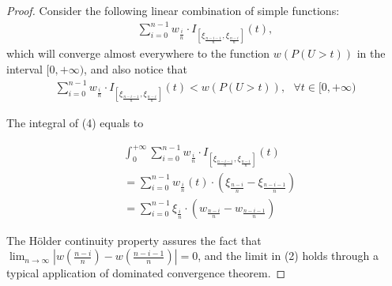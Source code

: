 \begin{proof}
Consider the following linear combination of simple functions:
\begin{align}
\sum_{i=0}^{n-1} w_{\frac{i}{n}} 
\cdot I_{[\xi_\frac{n-i-1}{n}, \xi_\frac{n-i}{n}]}(t),
\end{align}
which will converge almost everywhere to the function $w(P(U>t))$ in the interval $[0, +\infty)$, and also notice that 
\begin{align}
\sum_{i=0}^{n-1} w_{\frac{i}{n}} 
\cdot I_{[\xi_\frac{n-i-1}{n}, \xi_\frac{n-i}{n}]}(t)
<
w(P(U>t)),
\text{         } \forall t \in [0,+\infty)
\end{align}

The integral of (4) equals to 

\begin{align}
& \int_0^{+\infty} \sum_{i=0}^{n-1} w_{\frac{i}{n}} \cdot I_{[\xi_\frac{n-i-1}{n},
\xi_\frac{n-i}{n}]}(t) \\ & = \sum_{i=0}^{n-1} w_{\frac{i}{n}}(t) \cdot (\xi_{\frac{n-i}{n}} -
\xi_{\frac{n-i-1}{n}}) \\ & = \sum_{i=0}^{n-1} \xi_{\frac{i}{n}} \cdot (w_{\frac{n-i}{n}}-
    w_{\frac{n-i-1}{n}})
\end{align}

The H\"{o}lder continuity property assures the fact that 
$\lim_{n \rightarrow \infty}  | w(\frac{n-i}{n})- w(\frac{n-i-1}{n})| =0$, and the limit in (2) holds through a typical application of dominated convergence theorem.
\end{proof} 

